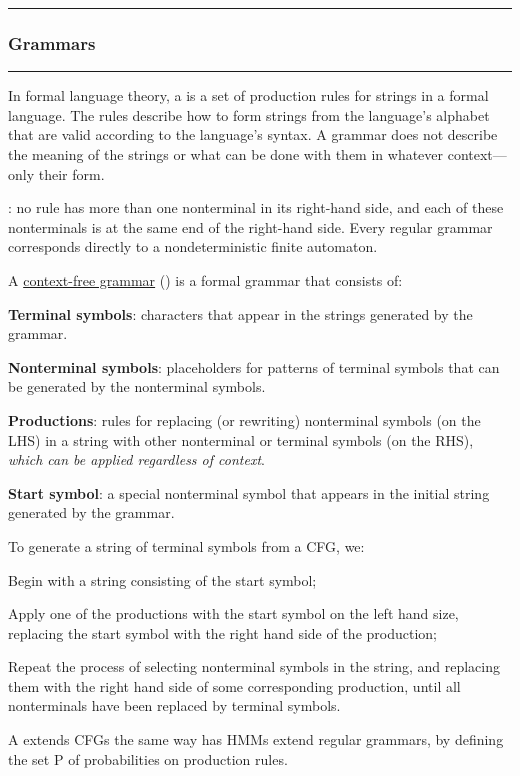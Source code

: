 \documentclass[11pt]{article}
\newcommand\myspace[1][]{\vspace{#1\bigskipamount}}
\newcommand\subsub[1]{\Needspace{15\baselineskip}\hrule\subsubsection{#1}\hrule}
\begin{document}
\myspace
\subsub{Grammars}
\myspace

In formal language theory, a  is a set of production rules for strings in a formal language. The rules describe how to form strings from the language's alphabet that are valid according to the language's syntax. A grammar does not describe the meaning of the strings or what can be done with them in whatever context—only their form.


\begin{compactitem}
	\item {}: no rule has more than one nonterminal in its right-hand side, and each of these nonterminals is at the same end of the right-hand side. Every regular grammar corresponds directly to a nondeterministic finite automaton. 
	
	\item A \href{https://www.cs.rochester.edu/~nelson/courses/csc_173/grammars/cfg.html}{context-free grammar} () is a formal grammar that consists of:
	\begin{footnotesize}
	\begin{compactitem}
		\item \textbf{Terminal symbols}: characters that appear in the strings generated by the grammar.
		\item \textbf{Nonterminal symbols}: placeholders for patterns of terminal symbols that can be generated by the nonterminal symbols.
		\item \textbf{Productions}: rules for replacing (or rewriting) nonterminal symbols (on the LHS) in a string with other nonterminal or terminal symbols (on the RHS), \textit{which can be applied regardless of context}. 
		\item \textbf{Start symbol}: a special nonterminal symbol that appears in the initial string generated by the grammar.
	\end{compactitem}
	\end{footnotesize}
	To generate a string of terminal symbols from a CFG, we:
	\begin{footnotesize}
	\begin{compactenum}
		\item Begin with a string consisting of the start symbol;
		\item Apply one of the productions with the start symbol on the left hand size, replacing the start symbol with the right hand side of the production;
		\item Repeat the process of selecting nonterminal symbols in the string, and replacing them with the right hand side of some corresponding production, until all nonterminals have been replaced by terminal symbols.
	\end{compactenum}
	\end{footnotesize}

	\item A  extends CFGs the same way has HMMs extend regular grammars, by defining the set P of probabilities on production rules. 
\end{compactitem}	
\end{document}
